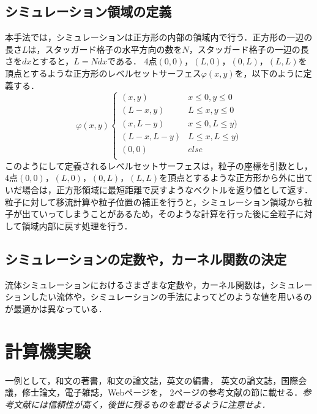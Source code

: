 \documentclass[a4j,12pt]{jreport}
\begin{document}
\section{シミュレーション領域の定義} \label{sec:levelsetserface}
本手法では，シミュレーションは正方形の内部の領域内で行う．正方形の一辺の長さ$L$は，スタッガード格子の水平方向の数を$N$，スタッガード格子の一辺の長さを$dx$とすると，$L = Ndx$である．
4点$(0,0)，(L,0)，(0,L)，(L,L)$を頂点とするような正方形のレベルセットサーフェス$\varphi(x,y)$を，以下のように定義する．
\begin{equation}\label{eq:levelsetserface}
\varphi(x,y)
\begin{cases}
(x,y) & x \le0 , y \le 0\\
(L - x,y) & L \le x , y \le 0\\
(x,L-y) & x \le0 , L \le y)\\
(L-x,L-y) & L \le x , L \le y)\\
(0,0) & else\\
\end{cases}
\end{equation} 
このようにして定義されるレベルセットサーフェスは，粒子の座標を引数とし，4点$(0,0)，(L,0)，(0,L)，(L,L)$を頂点とするような正方形から外に出ていだ場合は，正方形領域に最短距離で戻すようなベクトルを返り値として返す．粒子に対して移流計算や粒子位置の補正を行うと，シミュレーション領域から粒子が出ていってしまうことがあるため，そのような計算を行った後に全粒子に対して領域内部に戻す処理を行う．

\section{シミュレーションの定数や，カーネル関数の決定} \label{sec:constant}
流体シミュレーションにおけるさまざまな定数や，カーネル関数は，シミュレーションしたい流体や，シミュレーションの手法によってどのような値を用いるのが最適かは異なっている．
\chapter{計算機実験} \label{chapter:5}

一例として，和文の著書\cite{suetake}，和文の論文誌\cite{kusano}，英文の編書\cite{fuortes}，
英文の論文誌\cite{rice}，国際会議\cite{guibas}，修士論文\cite{chudai}，電子雑誌\cite{iwama}，Webページ\cite{IPSJ}を，
2ページの参考文献の節に載せる．{\em 参考文献には信頼性が高く，後世に残るものを載せるように注意せよ．}
\end{document}
